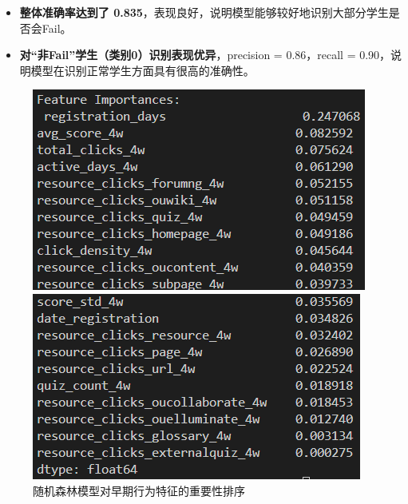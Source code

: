 \documentclass{SYSUReport}
\begin{document}
\begin{itemize}
    \item \textbf{整体准确率达到了 0.835}，表现良好，说明模型能够较好地识别大部分学生是否会Fail。
    \item \textbf{对“非Fail”学生（类别0）识别表现优异}，precision = 0.86，recall = 0.90，说明模型在识别正常学生方面具有很高的准确性。
\end{itemize}

\begin{figure}[htbp]
    \centering
    \begin{minipage}[b]{0.48\textwidth}
        \centering
        \includegraphics[width=\linewidth]{figures/rf_features1.png}
    \end{minipage}
    \hfill
    \begin{minipage}[b]{0.48\textwidth}
        \centering
        \includegraphics[width=\linewidth]{figures/rf_features2.png}
    \end{minipage}
    \caption{随机森林模型对早期行为特征的重要性排序}
    \label{fig:rf_feature_importance}
\end{figure}
\end{document}
